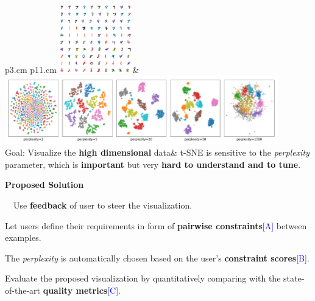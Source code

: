 \documentclass[portrait,final,a0paper]{nadiposter}
\newcommand{\compresslist}{%
\setlength{\itemsep}{1pt}%
\setlength{\parskip}{0pt}%
\setlength{\parsep}{0pt}%
\setlength{\leftmargin}{0pt}%
}
\begin{document}
\begin{poster}
{\begin{minipage}{0.63\linewidth}
    \begin{tabular}{p{3.cm} p{11.cm}}
        \includegraphics[height=8em]{images/mnist_raw200.pdf}&
        \includegraphics[height=8em]{images/MNIST-SMALL_examples.pdf}\\
        Goal: Visualize the \scriptsize{\textbf{high dimensional} data}&
        t-SNE is sensitive to the \emph{perplexity} parameter, which is \textbf{important} but very \textbf{hard to understand and to tune}.\\
    \end{tabular}
\end{minipage}
\begin{minipage}{0.33\linewidth}
    \begin{center} \Large{\textbf{Proposed Solution}}\end{center}
    $\quad$Use \textbf{feedback} of user to steer the visualization.
    
    \begin{itemize}
        \compresslist{
            \item Let users define their requirements in form of \textbf{pairwise constraints}\textcolor{blue}{[A]} between examples.
            \item The \emph{perplexity} is automatically chosen based on the user's \textbf{constraint scores}\textcolor{blue}{[B]}.
            \item Evaluate the proposed visualization by quantitatively comparing with the state-of-the-art \textbf{quality metrics}\textcolor{blue}{[C]}.
        }
    \end{itemize}
\end{minipage}
}



\end{poster}
\end{document}
